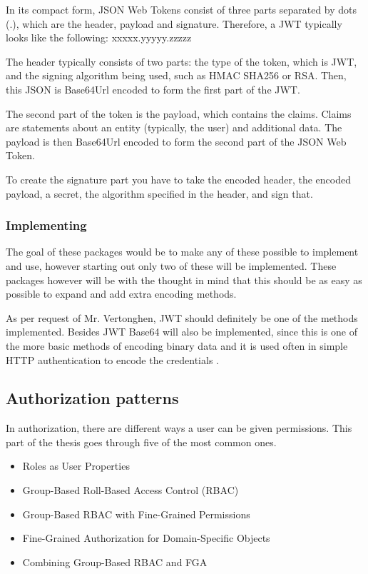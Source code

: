 In its compact form, JSON Web Tokens consist of three parts separated by dots (.), which are the header, payload and signature. Therefore, a JWT typically looks like the following: xxxxx.yyyyy.zzzzz

The header typically consists of two parts: the type of the token, which is JWT, and the signing algorithm being used, such as HMAC SHA256 or RSA. Then, this JSON is Base64Url encoded to form the first part of the JWT.

The second part of the token is the payload, which contains the claims. Claims are statements about an entity (typically, the user) and additional data. The payload is then Base64Url encoded to form the second part of the JSON Web Token.

To create the signature part you have to take the encoded header, the encoded payload, a secret, the algorithm specified in the header, and sign that.

\subsubsection{Implementing}

The goal of these packages would be to make any of these possible to implement and use, however starting out only two of these will be implemented. These packages however will be with the thought in mind that this should be as easy as possible to expand and add extra encoding methods.

As per request of Mr. Vertonghen, JWT should definitely be one of the methods implemented. Besides JWT Base64 will also be implemented, since this is one of the more basic methods of encoding binary data and it is used often in simple HTTP authentication to encode the credentials \autocite{JavaTPoint}.

\subsection{Authorization patterns}

In authorization, there are different ways a user can be given permissions. This part of the thesis goes through five of the most common ones.

\begin{itemize}
    \item Roles as User Properties
    \item Group-Based Roll-Based Access Control (RBAC)
    \item Group-Based RBAC with Fine-Grained Permissions
    \item Fine-Grained Authorization for Domain-Specific Objects
    \item Combining Group-Based RBAC and FGA
\end{itemize}

